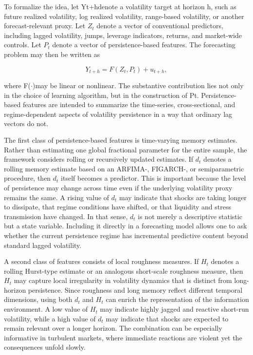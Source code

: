 \documentclass[12pt]{article}
\begin{document}
To formalize the idea, let Yt+hdenote a volatility target at horizon h, such as future realized volatility, log realized volatility, range-based volatility, or another forecast-relevant proxy. Let $Z_t$ denote a vector of conventional predictors, including lagged volatility, jumps, leverage indicators, returns, and market-wide controls. Let $P_t$ denote a vector of persistence-based features. The forecasting problem may then be written as

\[Y_{t+h} = F(Z_t, P_t) + u_{t+h},\]

where F($\cdot$)may be linear or nonlinear. The substantive contribution lies not only in the choice of learning algorithm, but in the construction of Pt. Persistence-based features are intended to summarize the time-series, cross-sectional, and regime-dependent aspects of volatility persistence in a way that ordinary lag vectors do not.

The first class of persistence-based features is time-varying memory estimates. Rather than estimating one global fractional parameter for the entire sample, the framework considers rolling or recursively updated estimates. If $d_t$ denotes a rolling memory estimate based on an ARFIMA-, FIGARCH-, or semiparametric procedure, then $d_t$ itself becomes a predictor. This is important because the level of persistence may change across time even if the underlying volatility proxy remains the same. A rising value of $d_t$ may indicate that shocks are taking longer to dissipate, that regime conditions have shifted, or that liquidity and stress transmission have changed. In that sense, $d_t$ is not merely a descriptive statistic but a state variable. Including it directly in a forecasting model allows one to ask whether the current persistence regime has incremental predictive content beyond standard lagged volatility.

A second class of features consists of local roughness measures. If $H_t$ denotes a rolling Hurst-type estimate or an analogous short-scale roughness measure, then $H_t$ may capture local irregularity in volatility dynamics that is distinct from long-horizon persistence. Since roughness and long memory reflect different temporal dimensions, using both $d_t$ and $H_t$ can enrich the representation of the information environment. A low value of $H_t$ may indicate highly jagged and reactive short-run volatility, while a high value of $d_t$ may indicate that shocks are expected to remain relevant over a longer horizon. The combination can be especially informative in turbulent markets, where immediate reactions are violent yet the consequences unfold slowly.
\end{document}
